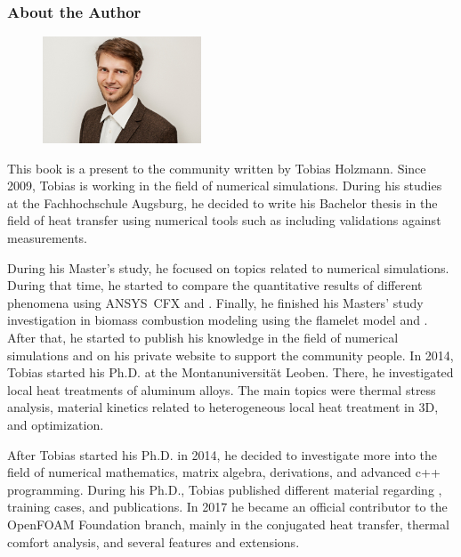 
\newpage
\pagestyle{empty}

\subsubsection{About the Author}


\begin{figure}
\begin{center}
 \includegraphics[width=0.42\textwidth]{Cover/TobiasHolzmann.jpg}
\end{center}
\end{figure}
This book is a present to the \OF community written by Tobias Holzmann.
Since 2009, Tobias is working in the field of numerical simulations. During his
studies at the Fachhochschule Augsburg, he decided to write his Bachelor thesis
in the field of heat transfer using numerical tools such as \OF including
validations against measurements.

During his Master's study, he focused on topics related to numerical simulations.
During that time, he started to compare the quantitative results of different
phenomena using ANSYS\textregistered~CFX and \OF. Finally, he finished his
Masters' study investigation in biomass combustion modeling using the flamelet
model and \OF. After that, he started to publish his knowledge in the field of
numerical simulations and \OF on his private website to support the \OF
community people. In 2014, Tobias started his Ph.D. at
the Montanuniversität Leoben. There, he investigated local heat treatments
of aluminum alloys. The main topics were thermal stress analysis, material
kinetics related to heterogeneous local heat treatment in 3D, and optimization.

After Tobias started his Ph.D. in 2014, he decided to investigate more into the
field of numerical mathematics, matrix algebra, derivations, and advanced
c++ programming. During his Ph.D., Tobias published different material regarding
\OF, training cases, and publications. In 2017 he became an
official contributor to the OpenFOAM Foundation branch, mainly in the
conjugated heat transfer, thermal comfort analysis, and several features and
extensions.

